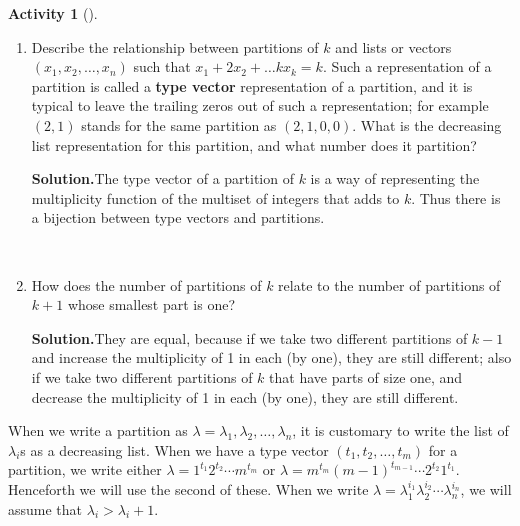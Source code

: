 \documentclass[10pt,]{book}
\newcommand{\terminology}[1]{\textbf{#1}}
\theoremstyle{plain}
\theoremstyle{definition}
\newtheorem{activity}[project]{Activity}
\numberwithin{equation}{chapter}
\begin{document}
\begin{activity}[]\label{activity-85}
~\par
\begin{enumerate}[label=(\alph*)]
 \item Describe the relationship between partitions of \(k\) and lists or vectors \((x_1,x_2,\ldots,x_n)\) such that \(x_1+2x_2+\ldots kx_k = k\).  Such a representation of a partition is called a \terminology{type vector} representation of a partition, and it is typical to leave the trailing zeros out of such a representation; for example \((2,1)\) stands for the same partition as \((2,1,0,0)\). What is the decreasing list representation for this partition, and what number does it partition?%
\par\medskip\noindent%
\textbf{Solution.}\quad The type vector of a partition of \(k\) is a way of representing the multiplicity function of the multiset of integers that adds to \(k\). Thus there is a bijection between type vectors and partitions.%

~\par
\item How does the number of partitions of \(k\) relate to the number of partitions of \(k+1\) whose smallest part is one?%
\par\medskip\noindent%
\textbf{Solution.}\quad They are equal, because if we take two different partitions of \(k-1\) and increase the multiplicity of 1 in each (by one), they are still different; also if we take two different partitions of \(k\) that have parts of size one, and decrease the multiplicity of 1 in each (by one), they are still different.%

\end{enumerate}
\end{activity}
When we write a partition as \(\lambda = \lambda_1,\lambda_2,\ldots,\lambda_n\), it is customary to write the list of \(\lambda_i\)s as a decreasing list. When we have a type vector \((t_1,t_2,\ldots,t_m)\) for a partition, we write either \(\lambda = 1^{t_1}2^{t_2}\cdots m^{t_m}\) or \(\lambda = m^{t_m}(m-1)^{t_{m-1}}\cdots 2^{t_2}1^{t_1}\). Henceforth we will use the second of these. When we write \(\lambda=\lambda_1^{i_1}\lambda_2^{i_2}\cdots\lambda_n^{i_n}\), we will assume that \(\lambda_i>\lambda_i+1\).%
\typeout{************************************************}
\typeout{************************************************}
\end{document}
